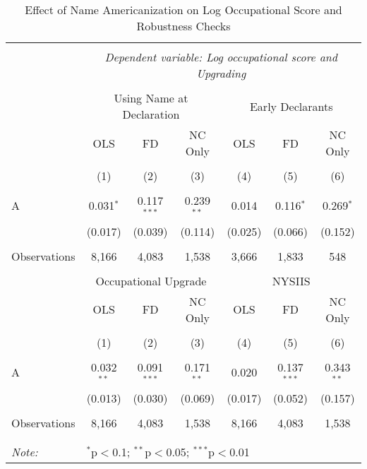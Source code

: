 \begin{table}[H] \centering 
	  \caption{Effect of Name Americanization on Log Occupational Score
	  	and Robustness Checks} 
  \label{tab:table5} 
\begin{tabular}{@{\extracolsep{5pt}}lcccccc} 
\\[-1.8ex]\hline 
\hline \\[-1.8ex] 
 & \multicolumn{6}{c}{\textit{Dependent variable: Log occupational score and Upgrading}} \\ 
\cline{2-7} 
\\[-1.8ex] & \multicolumn{3}{c}{Using Name at Declaration} & \multicolumn{3}{c}{Early Declarants} \\ \cmidrule(lr){2-4} \cmidrule(lr){5-7}
& OLS & FD &  NC Only &  OLS &  FD &  NC Only \\  
\\[-1.8ex] & (1) & (2) & (3) & (4) & (5) & (6)\\ 
\hline \\[-1.8ex] 
A & 0.031$^{*}$ & 0.117$^{***}$ & 0.239$^{**}$ & 0.014 & 0.116$^{*}$ & 0.269$^{*}$ \\ 
& (0.017) & (0.039) & (0.114) & (0.025) & (0.066) & (0.152) \\ 
  & & & & & & \\ 
Observations & 8,166 & 4,083 & 1,538 & 3,666 & 1,833 & 548 \\ 

\hline 
\\[-1.8ex] & \multicolumn{3}{c}{Occupational Upgrade} & \multicolumn{3}{c}{NYSIIS} \\ \cmidrule(lr){2-4} \cmidrule(lr){5-7}
& OLS & FD &  NC Only &  OLS &  FD &  NC Only \\  
\\[-1.8ex] & (1) & (2) & (3) & (4) & (5) & (6)\\ 
\hline \\[-1.8ex] 
 A & 0.032$^{**}$ & 0.091$^{***}$ & 0.171$^{**}$ & 0.020 & 0.137$^{***}$ & 0.343$^{**}$ \\ 
& (0.013) & (0.030) & (0.069) & (0.017) & (0.052) & (0.157) \\ 
& & & & & & \\ 

Observations & 8,166 & 4,083 & 1,538 & 8,166 & 4,083 & 1,538 \\ 

& & & & & & \\ 

\hline \\[-1.8ex] 
\textit{Note:}  & \multicolumn{6}{l}{$^{*}$p$<$0.1; $^{**}$p$<$0.05; $^{***}$p$<$0.01} \\ 
\end{tabular} 
\end{table} 